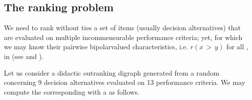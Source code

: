 \documentclass[a4paper,12pt,english]{sphinxhowto}
\begin{document}
\subsection{The ranking problem}
\label{\detokenize{tutorial:the-ranking-problem}}
We need to rank without ties a set  of items (usually decision alternatives) that are evaluated on multiple incommensurable performance criteria; yet, for which we may know their pairwise bipolar\sphinxhyphen{}valued  characteristics, i.e. \(r(x\, > \, y)\) for all ,  in  (see {\hyperref[\detokenize{tutorial:codual-digraph-label}]{}} and ).

Let us consider a didactic outranking digraph  generated from a random {\hyperref[\detokenize{tutorial:cost-benefit-performance-tableau-label}]{}} concerning 9 decision alternatives evaluated on 13 performance criteria. We may compute the corresponding  with a {\hyperref[\detokenize{tutorial:codual-transform-label}]{}} as follows.
\def\sphinxLiteralBlockLabel{\label{\detokenize{tutorial:strictoutranking}}}
\end{document}
